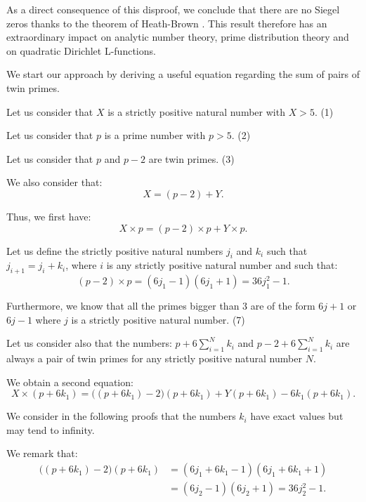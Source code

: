 \documentclass[11pt]{article}
\begin{document}
As a direct consequence of this disproof, we conclude that there are no Siegel zeros thanks to the theorem of Heath-Brown \cite{ref6}. This result therefore has an extraordinary impact on analytic number theory, prime distribution theory and on quadratic Dirichlet L-functions.

We start our approach by deriving a useful equation regarding the sum of pairs of twin primes.

Let us consider that $X$ is a strictly positive natural number with $X>5$. \hfill (1)

Let us consider that $p$ is a prime number with $p>5$. \hfill (2)

Let us consider that $p$ and $p-2$ are twin primes. \hfill (3)

We also consider that:
\begin{equation}
X = (p-2) + Y.
\end{equation}

Thus, we first have:
\begin{equation}
X \times p = (p-2)\times p + Y \times p.
\end{equation}

Let us define the strictly positive natural numbers $j_i$ and $k_i$ such that $j_{i+1} = j_i + k_i$, where $i$ is any strictly positive natural number and such that:
\begin{equation}
(p-2)\times p = (6 j_1 - 1)(6 j_1 + 1) = 36 j_1^2 - 1.
\end{equation}

Furthermore, we know that all the primes bigger than $3$ are of the form $6j+1$ or $6j-1$ where $j$ is a strictly positive natural number. \hfill (7)

Let us consider also that the numbers: $p + 6\sum_{i=1}^{N} k_i$ and $p - 2 + 6\sum_{i=1}^{N} k_i$ are always a pair of twin primes for any strictly positive natural number $N$.

We obtain a second equation:
\begin{equation}
X \times (p + 6k_1) = \big((p+6k_1)-2\big)(p+6k_1) + Y(p+6k_1) - 6k_1(p+6k_1).
\end{equation}

We consider in the following proofs that the numbers $k_i$ have exact values but may tend to infinity.

We remark that:
\begin{equation}
\begin{aligned}\big((p+6k_1)-2\big)(p+6k_1) &= (6j_1+6k_1-1)(6j_1+6k_1+1)\\ &= (6j_2-1)(6j_2+1) = 36 j_2^2 - 1.\end{aligned}
\end{equation}
\end{document}

